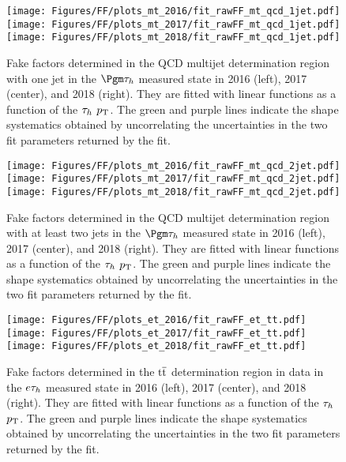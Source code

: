 \begin{figure}[ht!b]
\centering
\texttt{[image: Figures/FF/plots\_mt\_2016/fit\_rawFF\_mt\_qcd\_1jet.pdf]}
\texttt{[image: Figures/FF/plots\_mt\_2017/fit\_rawFF\_mt\_qcd\_1jet.pdf]}
\texttt{[image: Figures/FF/plots\_mt\_2018/fit\_rawFF\_mt\_qcd\_1jet.pdf]}\\
\caption{\label{fig:fit_raw_mt_1jet_qcd} Fake factors determined in the QCD multijet determination region with one jet in the $\Pgm\tauh$ measured state in 2016 (left), 2017 (center), and 2018 (right). They are fitted with linear functions as a function of the $\tau_h$ $p_{\mathrm{T}}$. The green and purple lines indicate the shape systematics obtained by uncorrelating the uncertainties in the two fit parameters returned by the fit.  }
\end{figure}

\begin{figure}[ht!b]
\centering
\texttt{[image: Figures/FF/plots\_mt\_2016/fit\_rawFF\_mt\_qcd\_2jet.pdf]}
\texttt{[image: Figures/FF/plots\_mt\_2017/fit\_rawFF\_mt\_qcd\_2jet.pdf]}
\texttt{[image: Figures/FF/plots\_mt\_2018/fit\_rawFF\_mt\_qcd\_2jet.pdf]}\\
\caption{\label{fig:fit_raw_mt_2jet_qcd} Fake factors determined in the QCD multijet determination region with at least two jets in the $\Pgm\tauh$ measured state in 2016 (left), 2017 (center), and 2018 (right). They are fitted with linear functions as a function of the $\tau_h$ $p_{\mathrm{T}}$. The green and purple lines indicate the shape systematics obtained by uncorrelating the uncertainties in the two fit parameters returned by the fit.  }
\end{figure}

\begin{figure}[ht!b]
\centering
\texttt{[image: Figures/FF/plots\_et\_2016/fit\_rawFF\_et\_tt.pdf]}
\texttt{[image: Figures/FF/plots\_et\_2017/fit\_rawFF\_et\_tt.pdf]}
\texttt{[image: Figures/FF/plots\_et\_2018/fit\_rawFF\_et\_tt.pdf]}\\
\caption{\label{fig:fit_raw_et_tt} Fake factors determined in the $\mathrm{t}\overline{\mathrm{t}}$ determination region in data in the $e\tau_h$ measured state in 2016 (left), 2017 (center), and 2018 (right). They are fitted with linear functions as a function of the $\tau_h$ $p_{\mathrm{T}}$. The green and purple lines indicate the shape systematics obtained by uncorrelating the uncertainties in the two fit parameters returned by the fit.  }
\end{figure}


